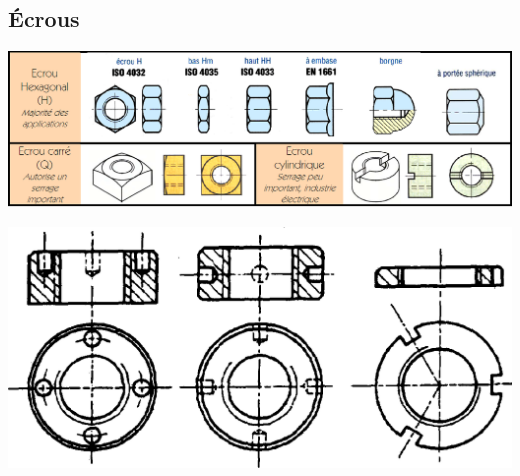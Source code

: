 \documentclass[11pt,oneside]{article}
\begin{document}
\subsection{Écrous}
\begin{center}
\includegraphics[width=.8\textwidth]{png/ecrous}
\end{center}



\begin{center}
\includegraphics[width=.7\textwidth]{png/ecrous_p}
\end{center}
\end{document}
